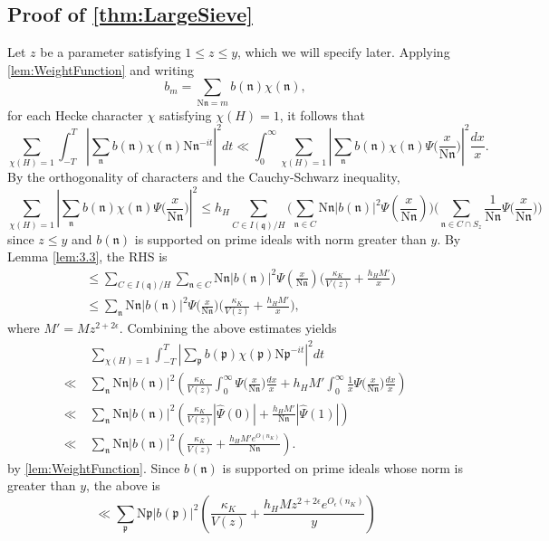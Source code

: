 \documentclass[12pt,psamsfonts]{amsart}
\theoremstyle{definition}
\theoremstyle{remark}
\numberwithin{equation}{section}
\theoremstyle{plain}
\theoremstyle{remark}
\renewcommand{\1}{ {\bf 1}}
\newcommand{\kn}{\mathfrak{n}}
\newcommand{\N}{\mathrm{N}}
\newcommand{\kp}{\mathfrak{p}}
\newcommand{\kq}{\mathfrak{q}}
\begin{document}
\subsection{Proof of \cref{thm:LargeSieve}}
Let $z$ be a parameter satisfying $1 \leq z \leq y$, which we will specify later. Applying \cref{lem:WeightFunction} and writing
\[
b_m=\sum_{\N\kn=m}b(\kn)\chi(\kn),
\]
for each Hecke character $\chi$ satisfying $\chi(H) = 1$, it follows that
\[
\sum_{\chi(H)=1}\int_{-T}^{T}\left|\sum_{\kn}b(\kn)\chi(\kn)\N\kn^{-it}\right|^2 dt\ll\int_0^{\infty}\sum_{\chi(H)=1}\left|\sum_{\kn}b(\kn)\chi(\kn)\Psi\Big(\frac{x}{\N\kn}\Big)\right|^2\frac{dx}{x}.
\]
 By the orthogonality of characters and the Cauchy-Schwarz inequality,
\[
 \sum_{\chi(H)=1}\left|\sum_{\kn}b(\kn)\chi(\kn) \Psi\Big(\frac{x}{\N\kn}\Big)\right|^2 \leq
  h_H \sum_{C \in I(\kq)/H} \Big( \sum_{\kn\in C}\N\kn |b(\kn)|^2 \Psi \left(\frac{x}{\N\kn}\right) \Big) \Big(\sum_{\kn\in C\cap S_z}\frac{1}{\N\kn} \Psi\Big(\frac{x}{\N\kn}\Big) \Big)
\]
since $z \leq y$ and $b(\kn)$ is supported on prime ideals with norm greater than $y$. 
By Lemma \ref{lem:3.3}, the RHS is
\begin{align*}
& \leq  \sum_{C \in I(\kq)/H} \sum_{\kn\in C}\N\kn |b(\kn)|^2 \Psi \left(\frac{x}{\N\kn}\right)\Big( \frac{\kappa_K}{V(z)}+ \frac{h_H M'}{x} \Big)  \\
& \leq \sum_{\kn} \N\kn|b(\kn)|^2 \Psi\Big(\frac{x}{\N\kn}\Big) \Big( \frac{\kappa_K}{V(z)}+ \frac{h_H M'}{x} \Big),
\end{align*}
where $M' = M z^{2+2\epsilon}$. 
Combining the above estimates yields
\begin{align*}
&\sum_{\chi(H)=1}\int_{-T}^{T}\left|\sum_{\kp}b(\kp)\chi(\kp)\N\kp^{-it}\right|^2 dt\\
\ll~&\sum_{\kn} \N\kn |b(\kn)|^2\left(\frac{\kappa_K}{V(z)}\int_{0}^{\infty} \Psi\Big(\frac{x}{\N\kn}\Big)\frac{dx}{x}+h_H M'\int_{0}^{\infty}\frac{1}{x}\Psi\Big(\frac{x}{\N\kn}\Big)\frac{dx}{x}\right)\\
\ll~&\sum_{\kn} \N\kn |b(\kn)|^2\left(\frac{\kappa_K}{V(z)}|\widehat{\Psi}(0)|+\frac{h_H M'}{\N\kn} |\widehat{\Psi}(1)|\right)\\
\ll~&\sum_{\kn} \N\kn|b(\kn)|^2\left(\frac{\kappa_K}{V(z)} + \frac{h_H M' e^{O(n_K)}}{\N\kn} \right). 
\end{align*}
by \cref{lem:WeightFunction}. 
Since $b(\kn)$ is supported on prime ideals whose norm is greater than $y$, the above is
\begin{equation}
\ll \sum_{\kp} \N\kp |b(\kp)|^2\left(\frac{\kappa_K}{V(z)} + \frac{h_H M z^{2+2\epsilon} e^{O_{\epsilon}(n_K)}}{y} \right)
\label{eqn:LargeSieve_Penultimate}
\end{equation}
\end{document}
